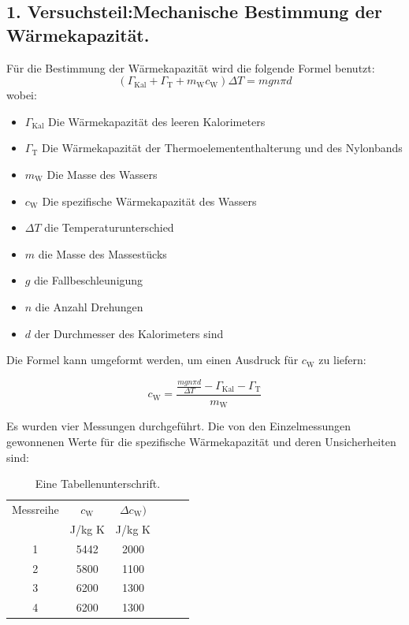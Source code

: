 \documentclass[11pt,a4paper]{article} %
\begin{document}
\subsection{1. Versuchsteil:Mechanische Bestimmung der Wärmekapazität.}

Für die Bestimmung der Wärmekapazität wird die folgende Formel benutzt:
\begin{equation}
(\Gamma_{\textrm{Kal}}+\Gamma_{\textrm{T}}+m_\textrm{W}c_\textrm{W})\Delta T = mgn\pi d
\end{equation}
wobei:
\begin{itemize}
	\item $\Gamma_{\textrm{Kal}}$ Die Wärmekapazität des leeren Kalorimeters
	\item $\Gamma_{\textrm{T}}$ Die Wärmekapazität der Thermoelemententhalterung und des Nylonbands
	\item $m_\textrm{W}$ Die Masse des Wassers
	\item $c_\textrm{W}$ Die spezifische Wärmekapazität des Wassers
	\item $\Delta T$ die Temperaturunterschied
	\item $m$ die Masse des Massestücks
	\item $g$ die Fallbeschleunigung
	\item $n$ die Anzahl Drehungen
	\item $d$ der Durchmesser des Kalorimeters sind
\end{itemize}

Die Formel kann umgeformt werden, um einen Ausdruck für $c_\textrm{W}$ zu liefern:

\begin{equation}
c_\textrm{W} = \frac{\frac{mgn\pi d}{\Delta T} - \Gamma_{\textrm{Kal}} - \Gamma_{\textrm{T}}}{m_\textrm{W}}
\end{equation}



Es wurden vier Messungen durchgeführt. Die von den Einzelmessungen gewonnenen Werte für die spezifische Wärmekapazität und deren Unsicherheiten sind:


\begin{table}[h]
	\centering
	\begin{tabular*}{0.99\textwidth}{@{\extracolsep{\fill}}cccccc}
		\toprule
		Messreihe & $c_\textrm{W}$ & $\Delta c_\textrm{W})$  \\
		& J/kg K & J/kg K   \\
		1 & 5442 & 2000 \\
		2 & 5800 & 1100 \\
		3 & 6200 & 1300 \\
		4 & 6200 & 1300 \\
		\bottomrule
	\end{tabular*}
	\caption{Eine Tabellenunterschrift.}
	\label{tabelle}
\end{table}
\end{document}
